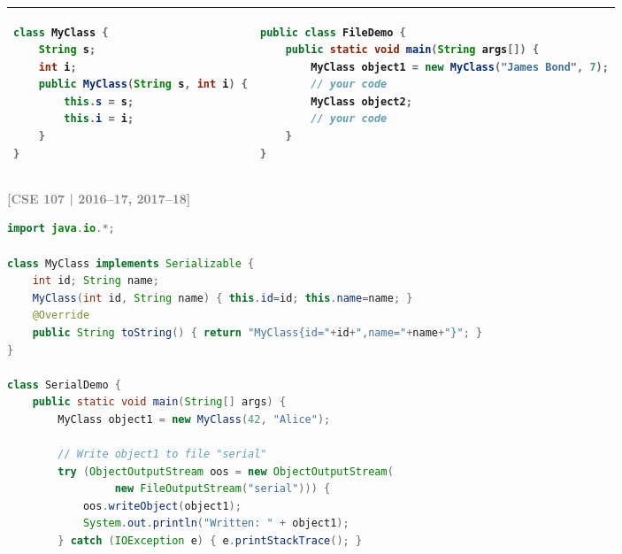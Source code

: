 \documentclass[12pt,a3paper]{article}
\newcommand{\yr}[1]{\hfill\textcolor{gray}{\small\textbf{[#1]}}}
\begin{document}
\begin{enumerate}
\begin{center}
\begin{tabular}{|p{}|p{}|}
\hline
\begin{minipage}[t]{0.45\textwidth}
\begin{lstlisting}[language=Java, basicstyle=\ttfamily\small, tabsize=4]
class MyClass {
    String s;
    int i;
    public MyClass(String s, int i) {
        this.s = s;
        this.i = i;
    }
}
\end{lstlisting}
\end{minipage} & 
\begin{minipage}[t]{0.5\textwidth}
\begin{lstlisting}[language=Java, basicstyle=\ttfamily\small, tabsize=4]
public class FileDemo {
    public static void main(String args[]) {
        MyClass object1 = new MyClass("James Bond", 7);
        // your code
        MyClass object2;
        // your code
    }
}
\end{lstlisting}
\end{minipage} \\
\hline
\end{tabular}
\end{center}

\yr{CSE 107 | 2016--17, 2017--18}

\begin{tcolorbox}[enhanced,breakable,ansbox,
  colback=cA!4,colframe=cA,boxrule=0.8pt,arc=5pt,
  title={\textbf{Answer --- Serialize object1 to File and Deserialize to object2}},
  fonttitle=\bfseries\color{white},colbacktitle=cA]
\begin{lstlisting}[language=Java]
import java.io.*;

class MyClass implements Serializable {
    int id; String name;
    MyClass(int id, String name) { this.id=id; this.name=name; }
    @Override
    public String toString() { return "MyClass{id="+id+",name="+name+"}"; }
}

class SerialDemo {
    public static void main(String[] args) {
        MyClass object1 = new MyClass(42, "Alice");

        // Write object1 to file "serial"
        try (ObjectOutputStream oos = new ObjectOutputStream(
                 new FileOutputStream("serial"))) {
            oos.writeObject(object1);
            System.out.println("Written: " + object1);
        } catch (IOException e) { e.printStackTrace(); }


\end{lstlisting}
\end{tcolorbox}
\end{enumerate}
\end{document}
